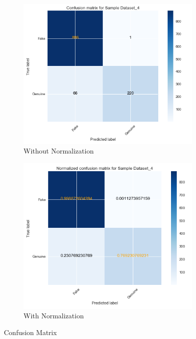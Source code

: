 \documentclass[a4paper, twoside, 12pt]{report}
\begin{document}
\begin{figure}[H]
	\centering
	\begin{subfigure}{.5\textwidth}
		\centering
		\includegraphics[scale=0.6]{matrix_4}
		\caption{Without Normalization}
		\label{fig:sub1}
	\end{subfigure}%
	\begin{subfigure}{.5\textwidth}
		\centering
		\includegraphics[scale=0.6]{matrix_nor_4}
		\caption{With Normalization}
		\label{fig:sub2}
	\end{subfigure}
	\caption{Confusion Matrix}
\end{figure}
\end{document}
